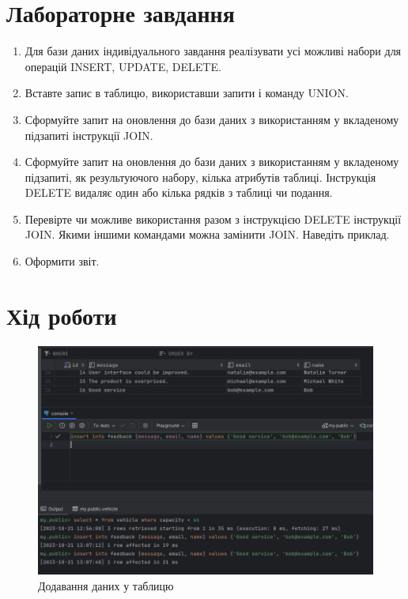 \documentclass[14pt]{extreport}
\begin{document}
\begin{normalsize}
	\section*{Лабораторне завдання}
	\begin{enumerate}
		\item Для бази даних індивідуального завдання реалізувати усі можливі набори
		для операцій INSERT, UPDATE, DELETE.
		\item Вставте запис в таблицю, використавши запити і команду UNION.
		\item Сформуйте запит на оновлення до бази даних з використанням у
		вкладеному підзапиті інструкції JOIN.
		\item Сформуйте запит на оновлення до бази даних з використанням у
		вкладеному підзапиті, як результуючого набору, кілька атрибутів таблиці.
		Інструкція DELETE видаляє один або кілька рядків з таблиці чи подання.
		\item Перевірте чи можливе використання разом з інструкцією DELETE
		інструкції JOIN. Якими іншими командами можна замінити JOIN. Наведіть приклад.
		\item Оформити звіт.
	\end{enumerate}
	
	\section*{Хід роботи}
	
	\begin{figure}[H]
		\centering
		\includegraphics[scale=0.5]{1}
		\caption{Додавання даних у таблицю}
	\end{figure}
	

\end{normalsize}
\end{document}
